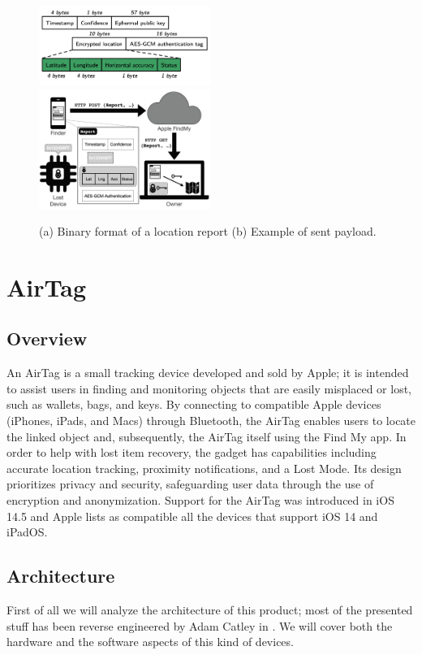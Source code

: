 \documentclass[english]{article}
\begin{document}
\begin{figure}
	\centering
	\includegraphics[width=0.5\textwidth]{images/packet.png}\hfill 
	\includegraphics[width=0.5\textwidth]{images/findmysec.png}
	\caption{(a) Binary format of a location report \quad (b) Example of sent payload.}
	\label{comparison}
\end{figure}


\section{AirTag}\label{sec:at}
\subsection{Overview}
An AirTag is a small tracking device developed and sold by Apple; it is intended to assist users in finding and monitoring objects that are easily misplaced or lost, such as wallets, bags, and keys. By connecting to compatible Apple devices (iPhones, iPads, and Macs) through Bluetooth, the AirTag enables users to locate the linked object and, subsequently, the AirTag itself using the Find My app. In order to help with lost item recovery, the gadget has capabilities including accurate location tracking, proximity notifications, and a Lost Mode. Its design prioritizes privacy and security, safeguarding user data through the use of encryption and anonymization. Support for the AirTag was introduced in iOS 14.5 and Apple lists as compatible all the devices that support iOS 14 and iPadOS.
\subsection{Architecture}
First of all we will analyze the architecture of this product; most of the presented stuff has been reverse engineered by Adam Catley in \cite{reverse}. We will cover both the hardware and the software aspects of this kind of devices.
\end{document}
